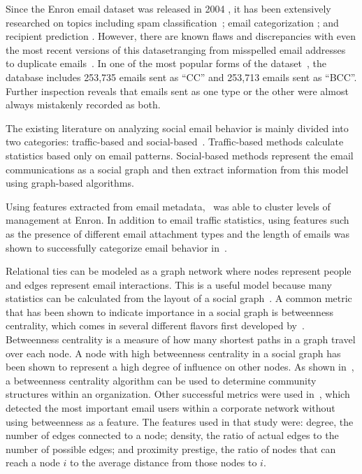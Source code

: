 \documentclass[12pt]{report}
\begin{document}
Since the Enron email dataset was released in 2004 \cite{klimt_introducing_2004}, it has been extensively researched on topics including spam classification~\cite{martin_analyzing_2005}; email categorization \cite{he_novel_2014}; and recipient prediction \cite{sofershtein_predicting_2015}.
However, there are known flaws and discrepancies with even the most recent versions of this dataset\textemdash{}ranging from misspelled email addresses~\cite{nordbo_data_2014} to duplicate emails~\cite{waterman_big_2014}.
In one of the most popular forms of the dataset~\cite{shetty_enron_2004}, the database includes 253,735 emails sent as ``CC'' and  253,713 emails sent as ``BCC''.
Further inspection reveals that emails sent as one type or the other were almost always mistakenly recorded as both.

The existing literature on analyzing social email behavior is mainly divided into two categories: traffic-based and social-based~\cite{tang_email_2013}.
Traffic-based methods calculate statistics based only on email patterns.
Social-based methods represent the email communications as a social graph and then extract information from this model using graph-based algorithms.

Using features extracted from email metadata,~\cite{yelupula_social_2008} was able to cluster levels of management at Enron.
In addition to email traffic statistics, using features such as the presence of different email attachment types and the length of emails was shown to successfully categorize email behavior in~\cite{martin_analyzing_2005}.

Relational ties can be modeled as a graph network where nodes represent people and edges represent email interactions.
This is a useful model because many statistics can be calculated from the layout of a social graph~\cite{wasserman_social_1994}.
A common metric that has been shown to indicate importance in a social graph is betweenness centrality, which comes in several different flavors first developed by~\cite{freeman_set_1977}.
Betweenness centrality is a measure of how many shortest paths in a graph travel over each node.
A node with high betweenness centrality in a social graph has been shown to represent a high degree of influence on other nodes.
As shown in~\cite{tyler_email_2003}, a betweenness centrality algorithm can be used to determine community structures within an organization.
Other successful metrics were used in~\cite{wilson_discovery_2009}, which detected the most important email users within a corporate network without using betweenness as a feature.
The features used in that study were: degree, the number of edges connected to a node; density, the ratio of actual edges to the number of possible edges; and proximity prestige, the ratio of nodes that can reach a node $i$ to the average distance from those nodes to $i$.
\end{document}
